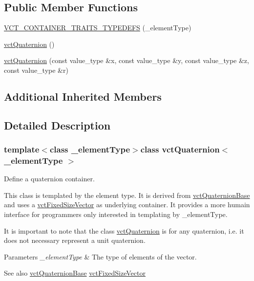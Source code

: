 \subsection*{Public Member Functions}
\begin{DoxyCompactItemize}
\item 
\hyperlink{classvct_quaternion_a8c9965ff5b6602b3d068797fe456dc78}{V\+C\+T\+\_\+\+C\+O\+N\+T\+A\+I\+N\+E\+R\+\_\+\+T\+R\+A\+I\+T\+S\+\_\+\+T\+Y\+P\+E\+D\+E\+F\+S} (\+\_\+element\+Type)
\item 
\hyperlink{classvct_quaternion_a2c37773efff24117e5209fa58dce02f4}{vct\+Quaternion} ()
\item 
\hyperlink{classvct_quaternion_a6987919ed544903ff0f3d075738d4908}{vct\+Quaternion} (const value\+\_\+type \&x, const value\+\_\+type \&y, const value\+\_\+type \&z, const value\+\_\+type \&r)
\end{DoxyCompactItemize}
\subsection*{Additional Inherited Members}


\subsection{Detailed Description}
\subsubsection*{template$<$class \+\_\+element\+Type$>$class vct\+Quaternion$<$ \+\_\+element\+Type $>$}

Define a quaternion container. 

This class is templated by the element type. It is derived from \hyperlink{classvct_quaternion_base}{vct\+Quaternion\+Base} and uses a \hyperlink{classvct_fixed_size_vector}{vct\+Fixed\+Size\+Vector} as underlying container. It provides a more humain interface for programmers only interested in templating by \+\_\+element\+Type.

It is important to note that the class \hyperlink{classvct_quaternion}{vct\+Quaternion} is for any quaternion, i.\+e. it does not necessary represent a unit quaternion.


\begin{DoxyParams}{Parameters}
{\em \+\_\+element\+Type} & The type of elements of the vector.\\
\hline
\end{DoxyParams}
\begin{DoxySeeAlso}{See also}
\hyperlink{classvct_quaternion_base}{vct\+Quaternion\+Base} \hyperlink{classvct_fixed_size_vector}{vct\+Fixed\+Size\+Vector} 
\end{DoxySeeAlso}


